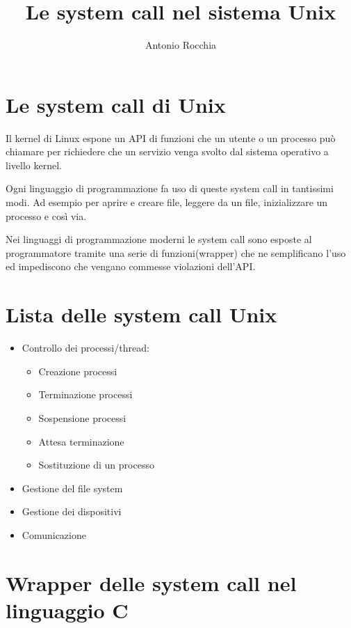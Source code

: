 \documentclass
[10pt,        %
 a4paper,     %
 onecolumn,   %
 fleqn,       %
 oneside,     %
 notitlepage, %
]{article}    %
\title{Le system call nel sistema Unix}
\author{Antonio Rocchia}
\begin{document}
\maketitle          
\tableofcontents %

\section{Le system call di Unix}
Il kernel di Linux espone un API di funzioni che un utente o un processo può chiamare per richiedere che un servizio venga svolto dal sistema operativo a livello kernel.

Ogni linguaggio di programmazione fa uso di queste system call in tantissimi modi. Ad esempio per aprire e creare file, leggere da un file, inizializzare un processo e così via.

Nei linguaggi di programmazione moderni le system call sono esposte al programmatore tramite una serie di funzioni(wrapper) che ne semplificano l'uso ed impediscono che vengano commesse violazioni dell'API.
\section{Lista delle system call Unix}
\begin{itemize}
    \item Controllo dei processi/thread:
        \begin{itemize}
            \item Creazione processi
            \item Terminazione processi
            \item Sospensione processi
            \item Attesa terminazione
            \item Sostituzione di un processo
        \end{itemize}
    \item Gestione del file system
    \item Gestione dei dispositivi
    \item Comunicazione
\end{itemize}

\section{Wrapper delle system call nel linguaggio C}
\end{document}
